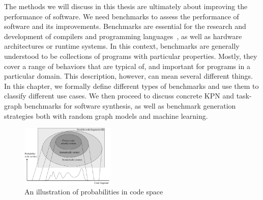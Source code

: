 The methods we will discuss in this thesis are ultimately about improving the performance of software. 
We need benchmarks to assess the performance of software and its improvements.
Benchmarks are essential for the research and development of compilers and programming languages~\cite{hall_compiler_research}, as well as hardware architectures or runtime systems.
In this context, benchmarks are generally understood to be collections of programs with particular properties.
Mostly, they cover a range of behaviors that are typical of, and important for programs in a particular domain.
This description, however, can mean several different things.
In this chapter, we formally define different types of benchmarks and use them to classify different use cases.
We then proceed to discuss concrete \ac{KPN} and task-graph benchmarks for software synthesis, as well as benchmark generation strategies both with random graph models and machine learning.


\begin{figure}[t]
	\centering
	\includegraphics[width=0.4\textwidth]{figures/code_space_venn.pdf}
	\caption{An illustration of probabilities in code space}
	\label{fig:pdf_programs}
\end{figure}


